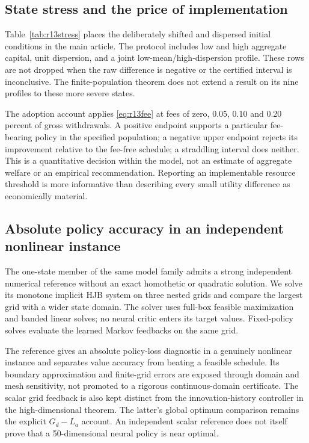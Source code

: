 \subsection{State stress and the price of implementation}
Table~\ref{tab:r13stress} places the deliberately shifted and dispersed initial conditions in the main article. The protocol includes low and high aggregate capital, unit dispersion, and a joint low-mean/high-dispersion profile. These rows are not dropped when the raw difference is negative or the certified interval is inconclusive. The finite-population theorem does not extend a result on its nine profiles to these more severe states.




The adoption account applies \eqref{eq:r13fee} at fees of zero, 0.05, 0.10 and 0.20 percent of gross withdrawals. A positive endpoint supports a particular fee-bearing policy in the specified population; a negative upper endpoint rejects its improvement relative to the fee-free schedule; a straddling interval does neither. This is a quantitative decision within the model, not an estimate of aggregate welfare or an empirical recommendation. Reporting an implementable resource threshold is more informative than describing every small utility difference as economically material.

\subsection{Absolute policy accuracy in an independent nonlinear instance}
The one-state member of the same model family admits a strong independent numerical reference without an exact homothetic or quadratic solution. We solve its monotone implicit HJB system on three nested grids and compare the largest grid with a wider state domain. The solver uses full-box feasible maximization and banded linear solves; no neural critic enters its target values. Fixed-policy solves evaluate the learned Markov feedbacks on the same grid.



The reference gives an absolute policy-loss diagnostic in a genuinely nonlinear instance and separates value accuracy from beating a feasible schedule. Its boundary approximation and finite-grid errors are exposed through domain and mesh sensitivity, not promoted to a rigorous continuous-domain certificate. The scalar grid feedback is also kept distinct from the innovation-history controller in the high-dimensional theorem. The latter's global optimum comparison remains the explicit $G_d-L_a$ account. An independent scalar reference does not itself prove that a 50-dimensional neural policy is near optimal.

